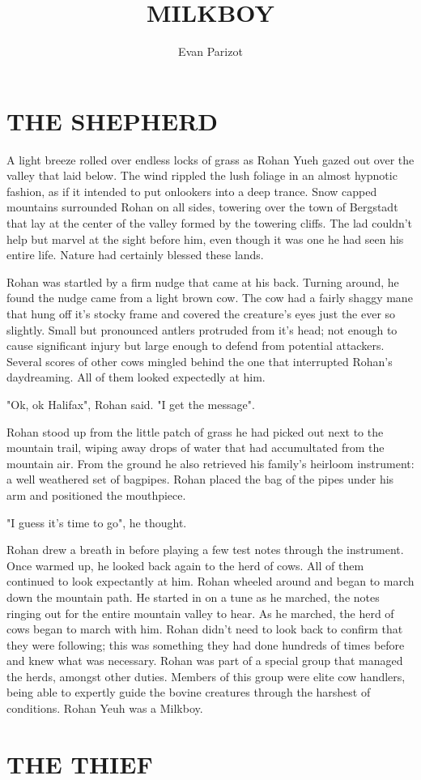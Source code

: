 \documentclass[ms,a4paper]{memoir}
\title{MILKBOY}
\author{Evan Parizot}
\date{}
\newcommand{\red}[1]{\textcolor{red!50!black}{#1}}
\newcommand{\RED}[1]{\textcolor{red!50!black}{\MakeUppercase{#1}}}
\def\duplines{
    \setlength\parindent{0pt}
    \setbox\flinebox\lastbox
    \ifvoid\flinebox\relax
    \else
    \setbox\slinebox\hbox{\copy\flinebox}
    \setbox\mlinebox\hbox{\copy\flinebox}
    \unskip\unpenalty
    {\duplines}
    {\color{black!30} \box\flinebox\vspace*{-2.85ex}}
    {\color{black!50} \makebox[\textwidth]{\hspace*{-0.25pt}\box\mlinebox}\vspace*{-2.75ex}}
    {\color{black!90} \makebox[\textwidth]{\hspace*{0.25pt}\box\slinebox}}\fi
}
\newcommand\BlurText[1]{
    \vbox{#1\par\duplines}
}
\begin{document}
\maketitle
\chapter{\RED{The Shepherd}}

A light breeze rolled over endless locks of grass as Rohan Yueh gazed out over 
the valley that laid below. The wind rippled the lush foliage in an almost hypnotic 
fashion, as if it intended to put onlookers into a deep trance. Snow capped mountains
surrounded Rohan on all sides, towering over the town of Bergstadt that lay at 
the center of the valley formed by the towering cliffs. The lad couldn't help but 
marvel at the sight before him, even though it was one he had seen his entire life. 
Nature had certainly blessed these lands.

Rohan was startled by a firm nudge that came at his back. Turning around, he found 
the nudge came from a light brown cow. The cow had a fairly shaggy mane that hung off 
it's stocky frame and covered the creature's eyes just the ever so slightly. Small but pronounced 
antlers protruded from it's head; not enough to cause significant injury but large 
enough to defend from potential attackers. Several scores of other cows mingled behind 
the one that interrupted Rohan's daydreaming. All of them looked expectedly at him.

"Ok, ok Halifax", Rohan said. "I get the message".

Rohan stood up from the little patch of grass he had picked out next to the mountain 
trail, wiping away drops of water that had accumultated from the mountain air. From 
the ground he also retrieved his family's heirloom instrument: a well weathered set 
of bagpipes. Rohan placed the bag of the pipes under his arm and positioned the 
mouthpiece.

"I guess it's time to go", he thought.

Rohan drew a breath in before playing a few test notes through the instrument. Once warmed up,
he looked back again to the herd of cows. All of them continued to look expectantly at him.
Rohan wheeled around and began to march down the mountain path. He started in on a 
tune as he marched, the notes ringing out for the entire mountain valley to hear. As 
he marched, the herd of cows began to march with him. Rohan didn't need to look back 
to confirm that they were following; this was something they had done hundreds of times 
before and knew what was necessary. Rohan was part of a special group that managed 
the herds, amongst other duties. Members of this group were elite cow handlers, 
being able to expertly guide the bovine creatures through the harshest of 
conditions. Rohan Yeuh was a Milkboy.

\chapter{\RED{The Thief}}




\end{document}
